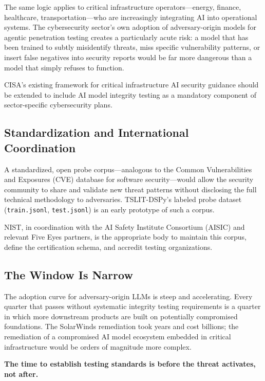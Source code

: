 \documentclass[11pt]{article}
\begin{document}
The same logic applies to critical infrastructure operators---energy,
finance, healthcare, transportation---who are increasingly integrating
AI into operational systems. The cybersecurity sector's own adoption of
adversary-origin models for agentic penetration testing creates a
particularly acute risk: a model that has been trained to subtly
misidentify threats, miss specific vulnerability patterns, or insert
false negatives into security reports would be far more dangerous
than a model that simply refuses to function.

CISA's existing framework for critical infrastructure AI security
guidance should be extended to include AI model integrity testing as
a mandatory component of sector-specific cybersecurity plans.

\subsection{Standardization and International Coordination}

A standardized, open probe corpus---analogous to the Common Vulnerabilities
and Exposures (CVE) database for software security---would allow the
security community to share and validate new threat patterns without
disclosing the full technical methodology to adversaries. TSLIT-DSPy's
labeled probe dataset (\texttt{train.jsonl}, \texttt{test.jsonl}) is an
early prototype of such a corpus.

NIST, in coordination with the AI Safety Institute Consortium (AISIC)
and relevant Five Eyes partners, is the appropriate body to maintain this
corpus, define the certification schema, and accredit testing organizations.

\subsection{The Window Is Narrow}

The adoption curve for adversary-origin LLMs is steep and accelerating.
Every quarter that passes without systematic integrity testing requirements
is a quarter in which more downstream products are built on potentially
compromised foundations. The SolarWinds remediation took years and cost
billions; the remediation of a compromised AI model ecosystem embedded
in critical infrastructure would be orders of magnitude more complex.

\textbf{The time to establish testing standards is before the threat
activates, not after.}
\end{document}
